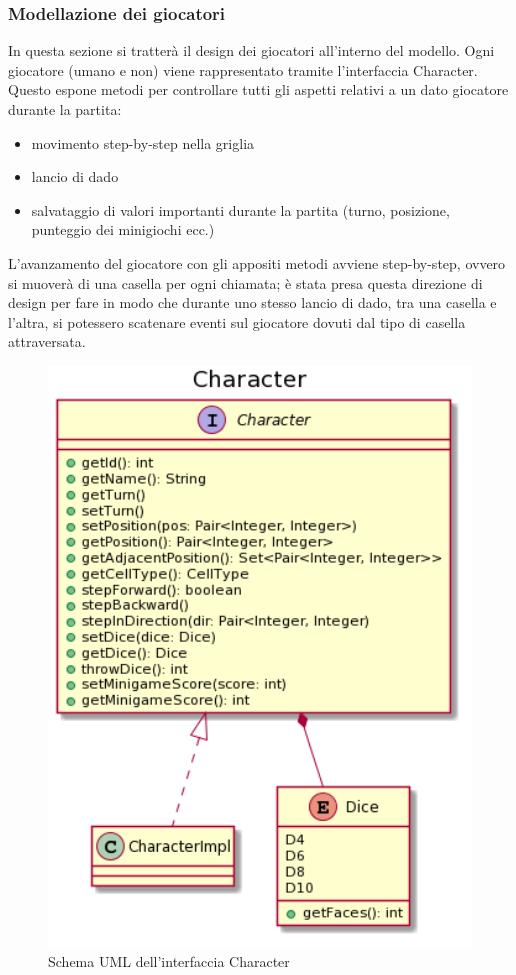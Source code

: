 \documentclass[a4paper,12pt]{report}
\begin{document}
	\subsubsection{Modellazione dei giocatori}
	In questa sezione si tratterà il design dei giocatori all'interno del modello.\newline
	\newline
	Ogni giocatore (umano e non) viene rappresentato tramite l'interfaccia Character.
	Questo espone metodi per controllare tutti gli aspetti relativi a un dato giocatore durante la partita:
	\begin{itemize}
		\item movimento step-by-step nella griglia
	    \item lancio di dado
	    \item salvataggio di valori importanti durante la partita (turno, posizione, punteggio dei minigiochi ecc.)
	\end{itemize}
	L'avanzamento del giocatore con gli appositi metodi avviene step-by-step, ovvero si muoverà di una
	casella per ogni chiamata; è stata presa questa direzione di design per fare in modo che durante
	uno stesso lancio di dado, tra una casella e l'altra, si potessero scatenare eventi sul giocatore
	dovuti dal tipo di casella attraversata.\newline
    \begin{figure}[!t]
        \centering{}
        \includegraphics[width=150mm]{images/picchiotti/character.png}
        \caption{Schema UML dell'interfaccia Character}
        \label{img:character}
    \end{figure}
\end{document}
